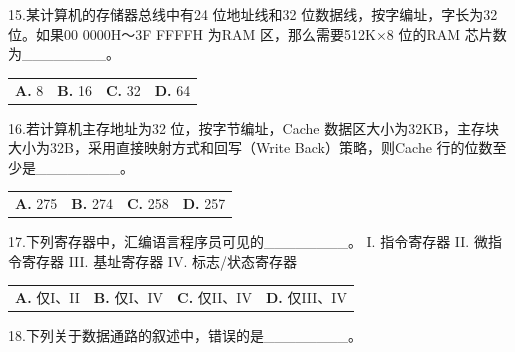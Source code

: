 \documentclass[UTF8,11pt]{ctexart}
\begin{document}
15.某计算机的存储器总线中有24 位地址线和32 位数据线，按字编址，字长为32 位。如果00 0000H～3F FFFFH 为RAM 区，那么需要512K×8 位的RAM 芯片数为\_\_\_\_\_\_\_\_。


\begin{center}\begin{tabular}{>{\raggedright\arraybackslash}p{\dimexpr(\linewidth-8\tabcolsep)/4\relax}>{\raggedright\arraybackslash}p{\dimexpr(\linewidth-8\tabcolsep)/4\relax}>{\raggedright\arraybackslash}p{\dimexpr(\linewidth-8\tabcolsep)/4\relax}>{\raggedright\arraybackslash}p{\dimexpr(\linewidth-8\tabcolsep)/4\relax}}
\textbf{A.} 8 & \textbf{B.} 16 & \textbf{C.} 32 & \textbf{D.} 64\\[.35em]\end{tabular}\end{center}

16.若计算机主存地址为32 位，按字节编址，Cache 数据区大小为32KB，主存块大小为32B，采用直接映射方式和回写（Write Back）策略，则Cache 行的位数至少是\_\_\_\_\_\_\_\_。


\begin{center}\begin{tabular}{>{\raggedright\arraybackslash}p{\dimexpr(\linewidth-8\tabcolsep)/4\relax}>{\raggedright\arraybackslash}p{\dimexpr(\linewidth-8\tabcolsep)/4\relax}>{\raggedright\arraybackslash}p{\dimexpr(\linewidth-8\tabcolsep)/4\relax}>{\raggedright\arraybackslash}p{\dimexpr(\linewidth-8\tabcolsep)/4\relax}}
\textbf{A.} 275 & \textbf{B.} 274 & \textbf{C.} 258 & \textbf{D.} 257\\[.35em]\end{tabular}\end{center}

17.下列寄存器中，汇编语言程序员可见的\_\_\_\_\_\_\_\_。 I. 指令寄存器 II. 微指令寄存器 III. 基址寄存器 IV. 标志/状态寄存器


\begin{center}\begin{tabular}{>{\raggedright\arraybackslash}p{\dimexpr(\linewidth-8\tabcolsep)/4\relax}>{\raggedright\arraybackslash}p{\dimexpr(\linewidth-8\tabcolsep)/4\relax}>{\raggedright\arraybackslash}p{\dimexpr(\linewidth-8\tabcolsep)/4\relax}>{\raggedright\arraybackslash}p{\dimexpr(\linewidth-8\tabcolsep)/4\relax}}
\textbf{A.} 仅I、II & \textbf{B.} 仅I、IV & \textbf{C.} 仅II、IV & \textbf{D.} 仅III、IV\\[.35em]\end{tabular}\end{center}

18.下列关于数据通路的叙述中，错误的是\_\_\_\_\_\_\_\_。
\end{document}
